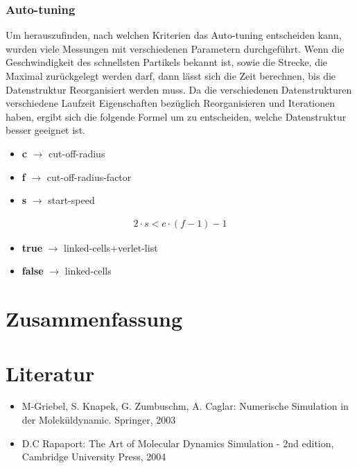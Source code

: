 \documentclass[
	12pt,
	a4paper,
	BCOR10mm,
	DIV14,
	headsepline,
]{scrreprt}
\begin{document}
\subsection{Auto-tuning}
Um herauszufinden, nach welchen Kriterien das Auto-tuning entscheiden kann, wurden viele Messungen mit verschiedenen Parametern durchgeführt. Wenn die Geschwindigkeit des schnellsten Partikels bekannt ist, sowie die Strecke, die Maximal zurückgelegt werden darf, dann lässt sich die Zeit berechnen, bis die Datenstruktur Reorganisiert werden muss. Da die verschiedenen Datenstrukturen verschiedene Laufzeit Eigenschaften bezüglich Reorganisieren und Iterationen haben, ergibt sich die folgende Formel um zu entscheiden, welche Datenstruktur besser geeignet ist.
\begin{itemize}
	\item \textbf{c} $\rightarrow$ cut-off-radius
	\item \textbf{f} $\rightarrow$ cut-off-radius-factor
	\item \textbf{s} $\rightarrow$ start-speed
\end{itemize}

\begin{align*}
	2\cdot s < c \cdot (f - 1) - 1
\end{align*}

\begin{itemize}
	\item \textbf{true} $\rightarrow$ linked-cells+verlet-list
	\item \textbf{false} $\rightarrow$ linked-cells
\end{itemize}
\chapter{Zusammenfassung}
\label{Zusammenfassung}


\chapter{Literatur}
\label{Literatur}

\begin{itemize}
	\item M-Griebel, S. Knapek, G. Zumbuschm, A. Caglar: Numerische Simulation in der Moleküldynamic. Springer, 2003
	\item D.C Rapaport: The Art of Molecular Dynamics Simulation - 2nd edition, Cambridge University Press, 2004
\end{itemize}
\end{document}
